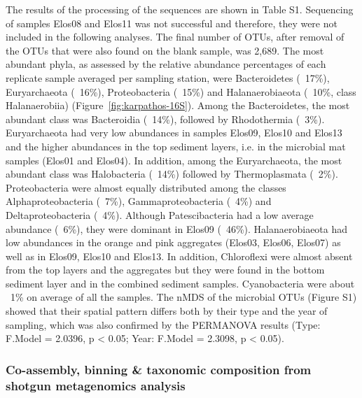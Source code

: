    The results of the processing of the sequences are shown in Table S1. 
   Sequencing of samples Elos08 and Elos11 was not successful and therefore, they were not included in the following analyses. 
   The final number of OTUs, after removal of the OTUs that were also found on the blank sample, was 2,689. 
   The most abundant phyla, as assessed by the relative abundance percentages of each replicate sample averaged per sampling station, were Bacteroidetes (~17\%), 
   Euryarchaeota (~16\%), Proteobacteria (~15\%) and Halanaerobiaeota (~10\%, class Halanaerobiia) (Figure~\ref{fig:karpathos-16S}). 
   Among the Bacteroidetes, the most abundant class was Bacteroidia (~14\%), followed by Rhodothermia (~3\%). 
   Euryarchaeota had very low abundances in samples Elos09, Elos10 and Elos13 and the higher abundances in the top sediment layers, i.e. in the microbial mat samples (Elos01 and Elos04). 
   In addition, among the Euryarchaeota, the most abundant class was Halobacteria (~14\%) followed by Thermoplasmata (~2\%). 
   Proteobacteria were almost equally distributed among the classes Alphaproteobacteria (~7\%), Gammaproteobacteria (~4\%) and Deltaproteobacteria (~4\%). 
   Although Patescibacteria had a low average abundance (~6\%), they were dominant in Elos09 (~46\%). 
   Halanaerobiaeota had low abundances in the orange and pink aggregates (Elos03, Elos06, Elos07) as well as in Elos09, Elos10 and Elos13. 
   In addition, Chloroflexi were almost absent from the top layers and the aggregates but they were found in the bottom sediment layer and in the combined sediment samples. 
   Cyanobacteria were about ~1\% on average of all the samples. 
   The nMDS of the microbial OTUs (Figure S1) showed that their spatial pattern differs both by their type and the year of sampling, which was also confirmed by the PERMANOVA results (Type: F.Model = 2.0396, p < 0.05; Year: F.Model = 2.3098, p < 0.05).


\subsubsection*{Co-assembly, binning \& taxonomic composition from shotgun metagenomics analysis}

